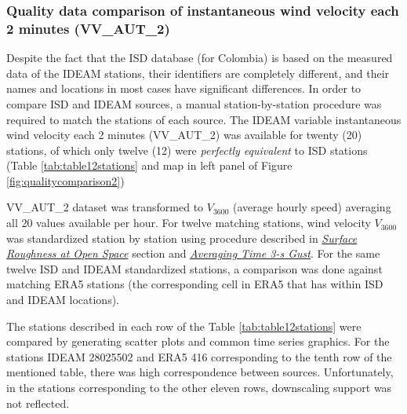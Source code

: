 \documentclass[12pt,twoside]{reedthesis}
\begin{document}
\hypertarget{quality-data-comparison-of-instantaneous-wind-velocity-each-2-minutes-vv_aut_2}{%
\subsubsection{Quality data comparison of instantaneous wind velocity each 2 minutes (VV\_AUT\_2)}\label{quality-data-comparison-of-instantaneous-wind-velocity-each-2-minutes-vv_aut_2}}

Despite the fact that the ISD database (for Colombia) is based on the measured data of the IDEAM stations, their identifiers are completely different, and their names and locations in most cases have significant differences. In order to compare ISD and IDEAM sources, a manual station-by-station procedure was required to match the stations of each source. The IDEAM variable instantaneous wind velocity each 2 minutes (VV\_AUT\_2) was available for twenty (20) stations, of which only twelve (12) were \emph{perfectly equivalent} to ISD stations (Table \ref{tab:table12stations} and map in left panel of Figure \ref{fig:qualitycomparison2})

VV\_AUT\_2 dataset was transformed to \(V_{3600}\) (average hourly speed) averaging all 20 values available per hour. For twelve matching stations, wind velocity \(V_{3600}\) was standardized station by station using procedure described in \emph{\protect\hyperlink{rmd-roughness}{Surface Roughness at Open Space}} section and \emph{\protect\hyperlink{rmd-gust}{Averaging Time 3-s Gust}}. For the same twelve ISD and IDEAM standardized stations, a comparison was done against matching ERA5 stations (the corresponding cell in ERA5 that has within ISD and IDEAM locations).

The stations described in each row of the Table \ref{tab:table12stations} were compared by generating scatter plots and common time series graphics. For the stations IDEAM 28025502 and ERA5 416 corresponding to the tenth row of the mentioned table, there was high correspondence between sources. Unfortunately, in the stations corresponding to the other eleven rows, downscaling support was not reflected.
\end{document}
